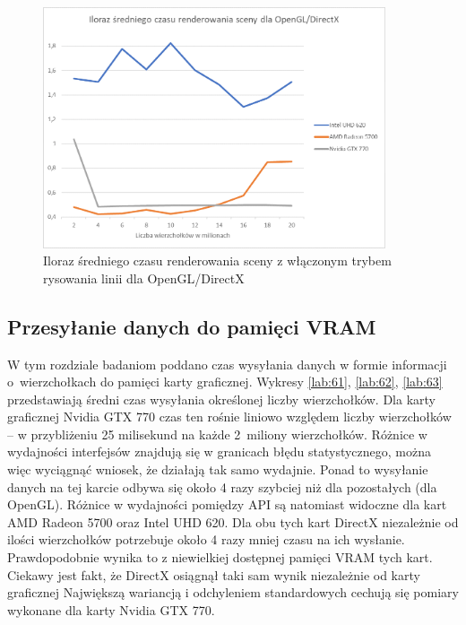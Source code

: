 \documentclass[archive]{mgr}
\begin{document}
\begin{figure}[h!]
  \centering
    \includegraphics[width=0.9\textwidth]{images/wire/4.png}
   \caption{Iloraz średniego czasu renderowania sceny z włączonym trybem rysowania linii dla OpenGL/DirectX}
   \label{lab:54}
\end{figure}
\bigbreak

\subsection{Przesyłanie danych do pamięci VRAM}


W tym rozdziale badaniom poddano czas wysyłania danych w formie informacji o~wierzchołkach do pamięci karty graficznej. Wykresy \ref{lab:61}, \ref{lab:62}, \ref{lab:63} przedstawiają średni czas wysyłania określonej liczby wierzchołków. Dla karty graficznej Nvidia GTX 770 czas ten rośnie liniowo względem liczby wierzchołków – w przybliżeniu 25 milisekund na każde 2~miliony wierzchołków. Różnice w wydajności interfejsów znajdują się w granicach błędu statystycznego, można więc wyciągnąć wniosek, że działają tak samo wydajnie. Ponad to wysyłanie danych na tej karcie odbywa się około 4 razy szybciej niż dla pozostałych (dla OpenGL). Różnice w wydajności pomiędzy API są natomiast widoczne dla kart AMD Radeon 5700 oraz Intel UHD 620. Dla obu tych kart DirectX niezależnie od ilości wierzchołków potrzebuje około 4 razy mniej czasu na ich wysłanie. Prawdopodobnie wynika to z niewielkiej dostępnej pamięci VRAM tych kart. Ciekawy jest fakt, że DirectX osiągnął taki sam wynik niezależnie od karty graficznej Największą wariancją i odchyleniem standardowych cechują się pomiary wykonane dla karty Nvidia GTX 770.
\end{document}
